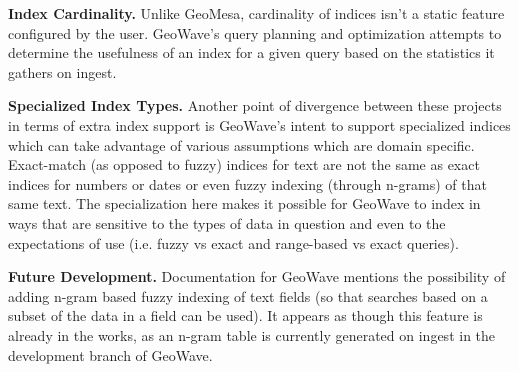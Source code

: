 {\bf Index Cardinality.}
Unlike GeoMesa, cardinality of indices isn't a static feature configured by the user.
GeoWave's query planning and optimization attempts to determine the usefulness of an index for a given query based on the statistics it gathers on ingest.

{\bf Specialized Index Types.}
Another point of divergence between these projects in terms of extra index support is GeoWave's intent to support specialized indices which can take advantage of various assumptions which are domain specific.
Exact-match (as opposed to fuzzy) indices for text are not the same as exact indices for numbers or dates or even fuzzy indexing (through n-grams) of that same text.
The specialization here makes it possible for GeoWave to index in ways that are sensitive to the types of data in question and even to the expectations of use (i.e. fuzzy vs exact and range-based vs exact queries).

{\bf Future Development.}
Documentation for GeoWave mentions the possibility of adding n-gram based fuzzy indexing of text fields (so that searches based on a subset of the data in a field can be used).
It appears as though this feature is already in the works, as an n-gram table is currently generated on ingest in the development branch of GeoWave.
